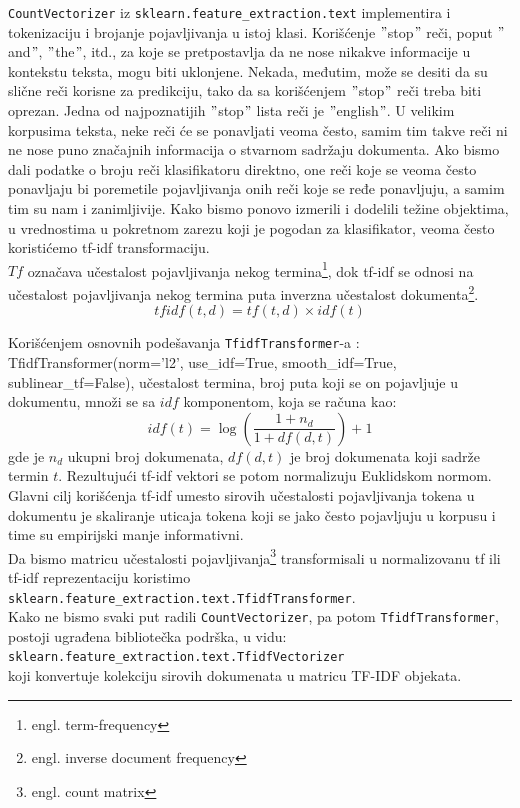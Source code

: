 \documentclass[a4paper]{article}
\begin{document}
\texttt{CountVectorizer} iz \texttt{sklearn.feature\_extraction.text} implementira i tokenizaciju i brojanje pojavljivanja u istoj klasi. Korišćenje $"$stop$"$ reči, poput $"$and$"$, $"$the$"$, itd., za koje se pretpostavlja da ne nose nikakve informacije u kontekstu teksta, mogu biti uklonjene. Nekada, međutim, može se desiti da su slične reči korisne za predikciju, tako da sa korišćenjem $"$stop$"$ reči treba biti oprezan. Jedna od najpoznatijih $"$stop$"$ lista reči je $"$english$"$.
U velikim korpusima teksta, neke reči će se ponavljati veoma često, samim tim takve reči ni ne nose puno značajnih informacija o stvarnom sadržaju dokumenta. Ako bismo dali podatke o broju reči klasifikatoru direktno, one reči koje se veoma često ponavljaju bi poremetile pojavljivanja onih reči koje se ređe ponavljuju, a samim tim su nam i zanimljivije. Kako bismo ponovo izmerili i dodelili težine objektima, u vrednostima u pokretnom zarezu koji je pogodan za klasifikator, veoma često koristićemo tf-idf transformaciju. \\
$Tf$ označava učestalost pojavljivanja nekog termina\footnote{engl. term-frequency}, dok tf-idf se odnosi na učestalost pojavljivanja nekog termina puta inverzna učestalost dokumenta\footnote{engl. inverse document frequency}.
\begin{equation}
tfidf(t,d) = tf(t,d) \times idf(t)
\end{equation}

Korišćenjem osnovnih podešavanja \texttt{TfidfTransformer}-a : TfidfTransformer(norm='l2', use\_idf=True, smooth\_idf=True, sublinear\_tf=False), učestalost termina, broj puta koji se on pojavljuje u dokumentu, množi se sa $idf$ komponentom, koja se računa kao:
\begin{equation}
idf(t) = \log(\frac{1 + n_d}{1 + df(d,t)}) +1
\end{equation}
gde je $n_d$ ukupni broj dokumenata, $df(d,t)$ je broj dokumenata koji sadrže termin $t$. Rezultujući tf-idf vektori se potom normalizuju Euklidskom normom. Glavni cilj korišćenja tf-idf umesto sirovih učestalosti pojavljivanja tokena u dokumentu je skaliranje uticaja tokena koji se jako često pojavljuju u korpusu i time su empirijski manje informativni.\\
Da bismo matricu učestalosti pojavljivanja\footnote{engl. count matrix} transformisali u normalizovanu tf ili tf-idf reprezentaciju koristimo\\ 
\texttt{sklearn.feature\_extraction.text.TfidfTransformer}.\\
Kako ne bismo svaki put radili \texttt{CountVectorizer}, pa potom \texttt{TfidfTransformer}, postoji ugrađena bibliotečka podrška, u vidu:\\
\texttt{sklearn.feature\_extraction.text.TfidfVectorizer}\\
koji konvertuje kolekciju sirovih dokumenata u matricu TF-IDF objekata.\\
\end{document}
